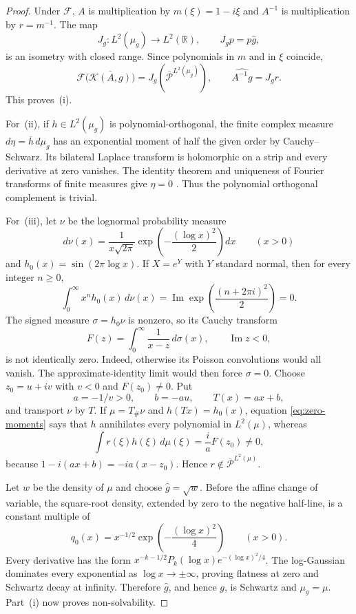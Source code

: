 \documentclass[11pt]{article}
\newcommand{\R}{\mathbb{R}}
\newcommand{\K}{\mathcal{K}}
\newcommand{\F}{\mathcal{F}}
\newcommand{\Pcal}{\mathcal{P}}
\begin{document}
\begin{proof}
Under $\F$, $A$ is multiplication by $m(\xi)=1-i\xi$ and $A^{-1}$ is
multiplication by $r=m^{-1}$.  The map
\[
 J_g:L^2(\mu_g)\to L^2(\R),\qquad J_gp=p\widehat g,
\]
is an isometry with closed range.  Since polynomials in $m$ and in $\xi$
coincide,
\[
 \F\bigl(\overline{\K(A,g)}\bigr)
 =J_g\left(\overline{\Pcal}^{L^2(\mu_g)}\right),
 \qquad \widehat{A^{-1}g}=J_gr.
\]
This proves~(i).

For~(ii), if $h\in L^2(\mu_g)$ is polynomial-orthogonal, the finite complex
measure $d\eta=\overline h\,d\mu_g$ has an exponential moment of half the
given order by Cauchy--Schwarz.  Its bilateral Laplace transform is holomorphic
on a strip and every derivative at zero vanishes.  The identity theorem and
uniqueness of Fourier transforms of finite measures give $\eta=0$
\cite[Chapter~9]{RudinRCA}.  Thus the polynomial orthogonal complement is
trivial.

For~(iii), let $\nu$ be the lognormal probability measure
\begin{equation}\label{eq:lognormal}
 d\nu(x)=\frac1{x\sqrt{2\pi}}
 \exp\left(-\frac{(\log x)^2}{2}\right)dx\qquad(x>0)
\end{equation}
and $h_0(x)=\sin(2\pi\log x)$.  If $X=e^Y$ with $Y$ standard normal, then
for every integer $n\geq0$,
\begin{equation}\label{eq:zero-moments}
 \int_0^\infty x^nh_0(x)\,d\nu(x)
 =\operatorname{Im}\exp\left(\frac{(n+2\pi i)^2}{2}\right)=0.
\end{equation}
The signed measure $\sigma=h_0\nu$ is nonzero, so its Cauchy transform
\[
 F(z)=\int_0^\infty\frac{1}{x-z}\,d\sigma(x),\qquad\operatorname{Im}z<0,
\]
is not identically zero.  Indeed, otherwise its Poisson convolutions would
all vanish.  The approximate-identity limit would then force $\sigma=0$.
Choose $z_0=u+iv$ with $v<0$ and $F(z_0)\ne0$.  Put
\[
 a=-1/v>0,\qquad b=-au,\qquad T(x)=ax+b,
\]
and transport $\nu$ by $T$.  If $\mu=T_\#\nu$ and $h(Tx)=h_0(x)$,
equation \eqref{eq:zero-moments} says that $h$ annihilates every polynomial in
$L^2(\mu)$, whereas
\[
 \int r(\xi)h(\xi)\,d\mu(\xi)
 =\frac{i}{a}F(z_0)\ne0,
\]
because $1-i(ax+b)=-ia(x-z_0)$.  Hence
$r\notin\overline{\Pcal}^{L^2(\mu)}$.

Let $w$ be the density of $\mu$ and choose $\widehat g=\sqrt w$.  Before the
affine change of variable, the square-root density, extended by zero to the
negative half-line, is a constant multiple of
\[
 q_0(x)=x^{-1/2}\exp\left(-\frac{(\log x)^2}{4}\right)\qquad(x>0).
\]
Every derivative has the form
$x^{-k-1/2}P_k(\log x)e^{-(\log x)^2/4}$.  The log-Gaussian dominates every
exponential as $\log x\to\pm\infty$, proving flatness at zero and Schwartz
decay at infinity.  Therefore $\widehat g$, and hence $g$, is Schwartz and
$\mu_g=\mu$.  Part~(i) now proves non-solvability.


\end{proof}
\end{document}
